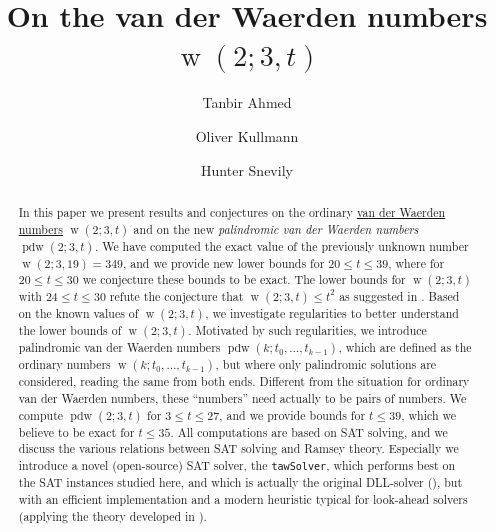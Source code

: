 \documentclass[final,3p,times]{elsarticle}
\theoremstyle{definition}
\renewcommand{\leq}{\le} %
\newcommand{\tawsolver}{\texttt{tawSolver}}
\DeclareMathOperator{\vdw}{w}
\DeclareMathOperator{\vdwpd}{pdw}
\begin{document}
\begin{frontmatter}
\title{On the van der Waerden numbers $\vdw(2;3,t)$}
\author[ahmed_address]{Tanbir Ahmed}
\address[ahmed_address]{Department of Computer Science and Software Engineering,
Concordia University, Montr\'eal, Canada. \\
ta\_ahmed@cs.concordia.ca}

\author[kullmann_address]{Oliver Kullmann}
\address[kullmann_address]{Computer Science Department,
Swansea University, Swansea, UK. \\
O.Kullmann@Swansea.ac.uk}

\author[snevily_address]{Hunter Snevily}
\address[snevily_address]{Department of Mathematics,
University of Idaho - Moscow, Idaho, USA.}

\begin{abstract}
In this paper
we present results and conjectures on the ordinary \href{http://en.wikipedia.org/wiki/Van_der_Waerden_number}{van der Waerden numbers} $\vdw(2; 3, t)$ and on the new \emph{palindromic van der Waerden numbers} $\vdwpd(2; 3, t)$.
We have computed the exact value of the previously unknown number $\vdw(2; 3, 19) = 349$, and we provide new lower bounds for $20 \leq t \leq 39$, where for $20 \leq t \leq 30$ we conjecture these bounds to be exact.
The lower bounds for $\vdw(2; 3, t)$ with $24 \leq t \leq 30$ refute the conjecture that $\vdw(2; 3, t)\leq t^2$ as suggested in \cite{blr2008}.
Based on the known values of $\vdw(2; 3, t)$, we investigate regularities to better understand the lower bounds of $\vdw(2; 3, t)$.
Motivated by such regularities, we introduce palindromic van der Waerden numbers $\vdwpd(k; t_0,\dots,t_{k-1})$, which are defined as the ordinary numbers $\vdw(k;t_0,\dots,t_{k-1})$, but where only palindromic solutions are considered, reading the same from both ends. Different from the situation for ordinary van der Waerden numbers, these ``numbers'' need actually to be pairs of numbers.
We compute $\vdwpd(2;3,t)$ for $3 \leq t \leq 27$, and we provide bounds for $t \leq 39$, which we believe to be exact for $t \leq 35$.
All computations are based on SAT solving, and we discuss the various relations between SAT solving and Ramsey theory. Especially we introduce a novel (open-source) SAT solver, the \tawsolver, which performs best on the SAT instances studied here, and which is actually the original DLL-solver (\cite{dpll}), but with an efficient implementation and a modern heuristic typical for look-ahead solvers (applying the theory developed in \cite{Kullmann2007HandbuchTau}).
\end{abstract}

\end{frontmatter}
\end{document}
